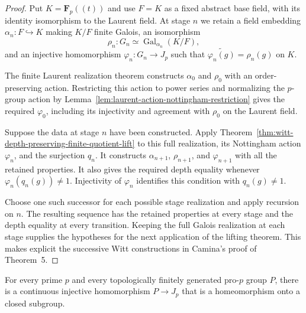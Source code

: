 \begin{proof}
Put $K=\mathbf F_p((t))$ and use $F=K$ as a fixed abstract base
field, with its identity isomorphism to the Laurent field.
At stage $n$ we retain a field embedding $\alpha_n:F\hookrightarrow K$
making $K/F$ finite Galois, an isomorphism
\[
 \rho_n:G_n\simeq\operatorname{Gal}_{\alpha_n}(K/F),
\]
and an injective homomorphism $\varphi_n:G_n\to J_p$
such that $\widetilde{\varphi_n(g)}=\rho_n(g)$ on $K$.

The finite Laurent realization theorem constructs $\alpha_0$
and $\rho_0$ with an order-preserving action. Restricting this
action to power series and normalizing the $p$-group action
by Lemma~\ref{lem:laurent-action-nottingham-restriction}
gives the required $\varphi_0$, including its injectivity
and agreement with $\rho_0$ on the Laurent field.

Suppose the data at stage $n$ have been constructed.
Apply Theorem~\ref{thm:witt-depth-preserving-finite-quotient-lift}
to this full realization, its Nottingham action $\varphi_n$,
and the surjection $q_n$. It constructs $\alpha_{n+1}$,
$\rho_{n+1}$, and $\varphi_{n+1}$ with all the retained
properties. It also gives the required depth equality whenever
$\varphi_n(q_n(g))\ne1$. Injectivity of $\varphi_n$ identifies
this condition with $q_n(g)\ne1$.

Choose one such successor for each possible stage realization
and apply recursion on $n$. The resulting sequence has the
retained properties at every stage and the depth equality at
every transition. Keeping the full Galois realization at each
stage supplies the hypotheses for the next application of the
lifting theorem. This makes explicit the successive Witt
constructions in Camina's proof of Theorem~5.
\end{proof}

\begin{theorem}
\label{thm:nottingham-finitely-generated-pro-p}
\leanok
For every prime $p$ and every topologically finitely generated
pro-$p$ group $P$, there is a continuous injective homomorphism
$P\to J_p$ that is a homeomorphism onto a closed subgroup.
\end{theorem}

